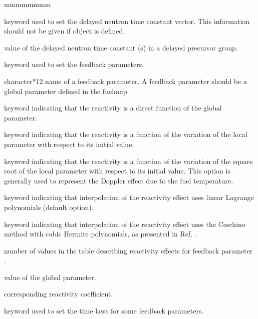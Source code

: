 \begin{ListeDeDescription}{mmmmmmmm}
\item[\moc{LAMBDAI}] keyword used to set the delayed neutron time constant vector. This information should not be given if object 
is defined.

\item[\dusa{lambdai}] value of the delayed neutron time constant (s) in a delayed precursor group.

\item[\moc{ALPHA}] keyword used to set the feedback parameters.

\item[\moc{PNAME}] character*12 name of a feedback parameter. A feedback parameter should be a global parameter defined in the fuelmap.

\item[\moc{DIRECT}] keyword indicating that the reactivity is a direct function of the global parameter.

\item[\moc{DERIV}] keyword indicating that the reactivity is a function of the variation of the local parameter with respect to its initial value.

\item[\moc{SQDERIV}] keyword indicating that the reactivity is a function of the variation of the square root of the local parameter with respect to its initial value.
This option is generally used to represent the Doppler effect due to the fuel temperature.

\item[\moc{LINEAR}] keyword indicating that interpolation of the reactivity effect uses linear Lagrange polynomials (default option).

\item[\moc{CUBIC}] keyword indicating that interpolation of the reactivity effect uses the Ceschino method
with cubic Hermite polynomials, as presented in Ref.~.

\item[\dusa{nalpha}] number of values in the table describing reactivity effects for feedback parameter .

\item[\dusa{x}] value of the global parameter.

\item[\dusa{y}] corresponding reactivity coefficient.

\item[\moc{PTIME}] keyword used to set the time laws for some feedback parameters.


\end{ListeDeDescription}
